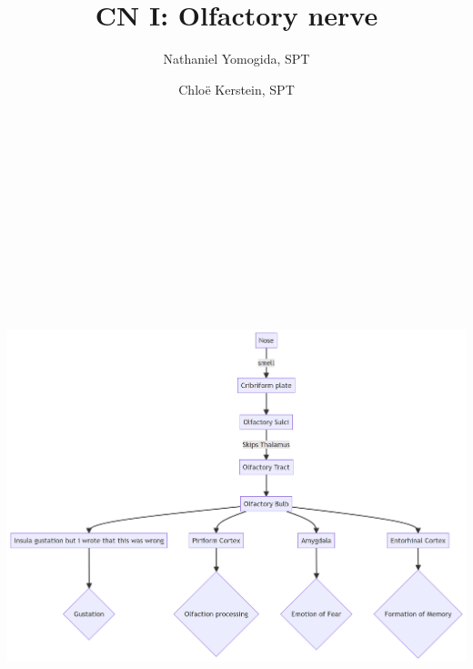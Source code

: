 \documentclass[
  letterpaper,
  DIV=11,
  numbers=noendperiod]{scrartcl}
\title{CN I: Olfactory nerve}
\author{Nathaniel Yomogida, SPT \and Chloë Kerstein, SPT}
\date{}
\renewcommand*\contentsname{Table of contents}
\newcommand\contentsname{Table of contents}
\begin{document}
\maketitle

\renewcommand*\contentsname{Table of contents}
{
\hypersetup{linkcolor=}
\setcounter{tocdepth}{3}
\tableofcontents
}
\includegraphics[width=10.93in,height=7.92in]{CN1_Olfactory_files/figure-latex/mermaid-figure-1.png}
\end{document}
